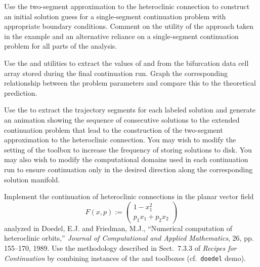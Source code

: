 \begin{exercises}

\item Use the two-segment approximation to the heteroclinic connection to construct an initial solution guess for a single-segment continuation problem with appropriate boundary conditions. Comment on the utility of the approach taken in the example and an alternative reliance on a single-segment continuation problem for all parts of the analysis.

\item Use the  and  utilities to extract the values of  and  from the bifurcation data cell array stored during the final continuation run. Graph the corresponding relationship between the problem parameters and compare this to the theoretical prediction.

\item Use the  to extract the trajectory segments for each labeled solution and generate an animation showing the sequence of consecutive solutions to the extended continuation problem that lead to the construction of the two-segment approximation to the heteroclinic connection. You may wish to modify the  setting of the  toolbox to increase the frequency of storing solutions to disk. You may also wish to modify the computational domains used in each continuation run to ensure continuation only in the desired direction along the corresponding solution manifold.

\item Implement the continuation of heteroclinic connections in the planar vector field
\[
F(x,p):=\left(\begin{array}{c}1-x_1^2\\p_1x_1+p_2x_2\end{array}\right)
\]
analyzed in Doedel, E.J. and Friedman, M.J., ``Numerical computation of heteroclinic
orbits,'' \emph{Journal of Computational and Applied Mathematics}, 26, pp. 155--170, 1989. Use the methodology described in Sect.~7.3.3 of \emph{Recipes for Continuation} by combining instances of the  and  toolboxes (cf.~\texttt{doedel} demo).

\end{exercises}


